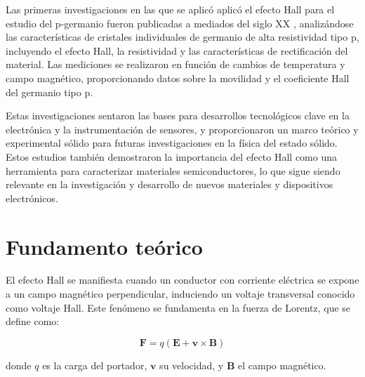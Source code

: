 	\vspace{\baselineskip}
	
	Las primeras investigaciones en las que se aplicó aplicó el efecto Hall para el estudio del p-germanio fueron publicadas a mediados del siglo XX \cite{Dunlap1950}\cite{Gallagher1968}, analizándose las características de cristales individuales de germanio de alta resistividad tipo p, incluyendo el efecto Hall, la resistividad y las características de rectificación del material. Las mediciones se realizaron en función de cambios de temperatura y campo magnético, proporcionando datos sobre la movilidad y el coeficiente Hall del germanio tipo p. 
	
	\vspace{\baselineskip}
	
	Estas investigaciones sentaron las bases para desarrollos tecnológicos clave en la electrónica y la instrumentación de sensores, y proporcionaron un marco teórico y experimental sólido para futuras investigaciones en la física del estado sólido. Estos estudios también demostraron la importancia del efecto Hall como una herramienta para caracterizar materiales semiconductores, lo que sigue siendo relevante en la investigación y desarrollo de nuevos materiales y dispositivos electrónicos.
	
    
	
	
	\section{Fundamento teórico}
	El efecto Hall se manifiesta cuando un conductor con corriente eléctrica se expone a un campo magnético perpendicular, induciendo un voltaje transversal conocido como voltaje Hall. Este fenómeno se fundamenta en la fuerza de Lorentz, que se define como:
	
	\vspace{\baselineskip}

	\begin{equation} \label{eq:lorentz}
		\mathbf{F} = q(\mathbf{E} + \mathbf{v} \times \mathbf{B})
	\end{equation}
	
	\vspace{\baselineskip}
	
	donde \( q \) es la carga del portador, \( \mathbf{v} \) su velocidad, y \( \mathbf{B} \) el campo magnético.
	
	\vspace{\baselineskip}
	
